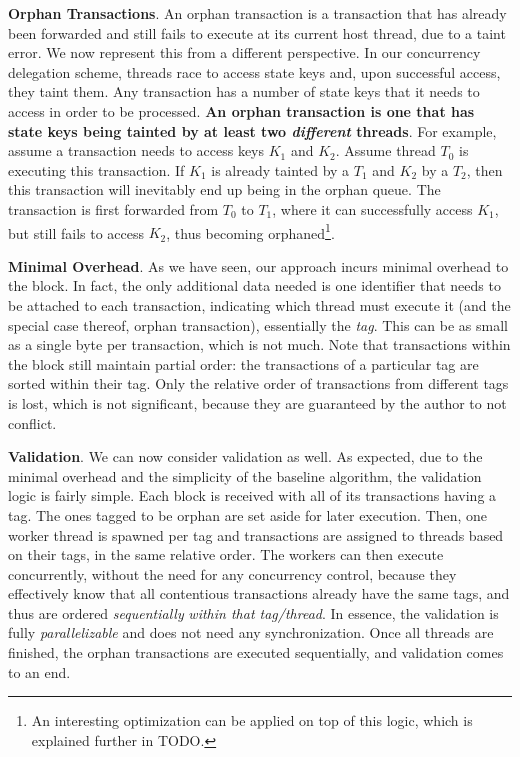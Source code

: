 \textbf{Orphan Transactions}. An orphan transaction is a transaction that has already been
forwarded and still fails to execute at its current host thread, due to a taint error. We now
represent this from a different perspective. In our concurrency delegation scheme, threads race to
access state keys and, upon successful access, they taint them. Any transaction has a number of state
keys that it needs to access in order to be processed. \textbf{An orphan transaction is one that has
state keys being tainted by at least two \textit{different} threads}. For example, assume a
transaction needs to access keys $K_{1}$ and $K_{2}$. Assume thread $T_{0}$ is executing this
transaction. If $K_{1}$ is already tainted by a $T_{1}$ and $K_{2}$ by a $T_{2}$, then this
transaction will inevitably end up being in the orphan queue. The transaction is first forwarded
from $T_{0}$ to $T_{1}$, where it can successfully access $K_{1}$, but still fails to access
$K_{2}$, thus becoming orphaned\footnote{An interesting optimization can be applied on top of this logic,
which is explained further in TODO.}.

\textbf{Minimal Overhead}. As we have seen, our approach incurs minimal overhead to the block. In
fact, the only additional data needed is one identifier that needs to be attached to each
transaction, indicating which thread must execute it (and the special case thereof, orphan
transaction), essentially the \textit{tag}. This can be as small as a single byte per transaction,
which is not much. Note that transactions within the block still maintain partial order: the
transactions of a particular tag are sorted within their tag. Only the relative order of
transactions from different tags is lost, which is not significant, because they are guaranteed by
the author to not conflict.

\textbf{Validation}. We can now consider validation as well. As expected, due to the minimal
overhead and the simplicity of the baseline algorithm, the validation logic is fairly simple. Each
block is received with all of its transactions having a tag. The ones tagged to be orphan are set
aside for later execution. Then, one worker thread is spawned per tag and transactions are assigned
to threads based on their tags, in the same relative order. The workers can then execute
concurrently, without the need for any concurrency control, because they effectively know that all
contentious transactions already have the same tags, and thus are ordered \textit{sequentially}
\textit{within that tag/thread}. In essence, the validation is fully \textit{parallelizable} and
does not need any synchronization. Once all threads are finished, the orphan transactions are
executed sequentially, and validation comes to an end.


